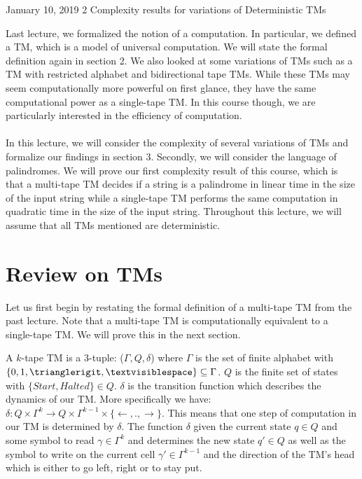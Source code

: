 \documentclass[usletter]{article}
\begin{document}
           {January 10, 2019}                          %
           {2}                                       %
           {Complexity results for variations of Deterministic TMs}  %

\noindent
Last lecture, we formalized the notion of a computation. In particular, we defined a TM, which is a model of universal computation. We will state the formal definition again in section 2. We also looked at some variations of TMs such as a TM with restricted alphabet and bidirectional tape TMs. While these TMs may seem computationally more powerful on first glance, they have the same computational power as a single-tape TM. In this course though, we are particularly interested in the efficiency of computation.
\\ \\
In this lecture, we will consider the complexity of several variations of TMs and formalize our findings in section 3. Secondly, we will consider the language of palindromes. We will prove our first complexity result of this course, which is that a multi-tape TM decides if a string is a palindrome in linear time in the size of the input string while a single-tape TM performs the same computation in quadratic time in the size of the input string. Throughout this lecture, we will assume that all TMs mentioned are deterministic.


\section{Review on TMs}
Let us first begin by restating the formal definition of a multi-tape TM from the past lecture. Note that a multi-tape TM is computationally equivalent to a single-tape TM. We will prove this in the next section.   

\begin{definition}
A $k$-tape TM is a $3$-tuple: ($\Gamma, Q, \delta$) where $\Gamma$ is the set of finite alphabet with $\{0, 1, \trianglerigit, \textvisiblespace\} \subseteq \Gamma$. $Q$ is the finite set of states with $\{ \mathit{Start}, \mathit{Halted}\} \in Q$. $\delta$ is the transition function which describes the dynamics of our TM. More specifically we have: $\delta: Q \times \Gamma^k \rightarrow Q \times \Gamma^{k-1} \times \{\leftarrow, . , \rightarrow \}$. This means that one step of computation in our TM is determined by $\delta$. The function $\delta$ given the current state $q \in Q$ and some symbol to read $\gamma \in \Gamma^k$ and determines the new state $q' \in Q$ as well as the symbol to write on the current cell $\gamma' \in \Gamma^{k-1}$ and the direction of the TM's head which is either to go left, right or to stay put.
\end{definition}
\end{document}
